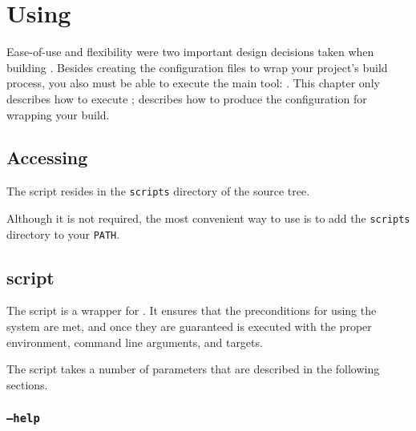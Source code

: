 %
%
%
%
\chapter{Using \lmsbw}

Ease-of-use and flexibility were two important design decisions taken
when building \lmsbw.  Besides creating the configuration files to wrap
your project's build process, you also must be able to execute the
main tool: \lmsbw.  This chapter only describes how to execute \lmsbw;
 describes how to produce the configuration for
wrapping your build.

\section{Accessing \lmsbw}

The \lmsbw script resides in the \texttt{scripts} directory of the
\lmsbw source tree.

Although it is not required, the most convenient way to use \lmsbw is
to add the \texttt{scripts} directory to your \texttt{PATH}.

\section{\lmsbw script}

The \lmsbw script is a wrapper for \make.  It ensures that the
preconditions for using the \lmsbw system are met, and once they are
guaranteed \make is executed with the proper environment, command line
arguments, and targets.

The \lmsbw script takes a number of parameters that are described in
the following sections.

\subsection{\texttt{--help}}

